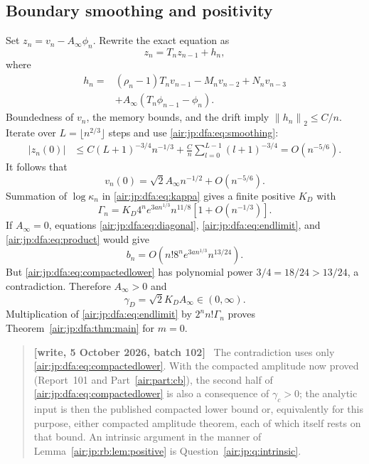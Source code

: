 \documentclass[11pt,letterpaper]{article}
\numberwithin{equation}{section}
\theoremstyle{remark}
\newenvironment{writenotejp}{\par\smallskip\begin{quote}\small\textbf{[write, 5 October 2026, batch 102]}\ }{\end{quote}\smallskip}
\newcommand{\normtwo}[1]{\left\lVert#1\right\rVert_2}
\begin{document}
\subsection{Boundary smoothing and positivity}
Set $z_n=v_n-A_\infty\phi_n$. Rewrite the exact equation as
\[
 z_n=T_nz_{n-1}+h_n,
\]
where
\begin{align*}
 h_n={}&(\rho_n-1)T_nv_{n-1}-M_nv_{n-2}+N_nv_{n-3}\\
 &+A_\infty(T_n\phi_{n-1}-\phi_n).
\end{align*}
Boundedness of $v_n$, the memory bounds, and the drift imply $\normtwo{h_n}\le C/n$. Iterate over $L=\lfloor n^{2/3}\rfloor$ steps and use \eqref{air:jp:dfa:eq:smoothing}:
\begin{align*}
 |z_n(0)|&\le C(L+1)^{-3/4}n^{-1/3}
 +\frac Cn\sum_{l=0}^{L-1}(l+1)^{-3/4}
 =O(n^{-5/6}).
\end{align*}
It follows that
\begin{equation}\label{air:jp:dfa:eq:endlimit}
 v_n(0)=\sqrt2 A_\infty n^{-1/2}+O(n^{-5/6}).
\end{equation}
Summation of $\log\kappa_n$ in \eqref{air:jp:dfa:eq:kappa} gives a finite positive $K_D$ with
\begin{equation}\label{air:jp:dfa:eq:product}
 \Gamma_n=K_D4^ne^{3an^{1/3}}n^{11/8}[1+O(n^{-1/3})].
\end{equation}
If $A_\infty=0$, equations \eqref{air:jp:dfa:eq:diagonal}, \eqref{air:jp:dfa:eq:endlimit}, and \eqref{air:jp:dfa:eq:product} would give
\[
 b_n=O\!\left(n!8^ne^{3an^{1/3}}n^{13/24}\right).
\]
But \eqref{air:jp:dfa:eq:compactedlower} has polynomial power $3/4=18/24>13/24$, a contradiction. Therefore $A_\infty>0$ and
\begin{equation}\label{air:jp:dfa:eq:gamma}
 \gamma_D=\sqrt2 K_DA_\infty\in(0,\infty).
\end{equation}
Multiplication of \eqref{air:jp:dfa:eq:endlimit} by $2^n n!\Gamma_n$ proves Theorem~\ref{air:jp:dfa:thm:main} for $m=0$.
\begin{writenotejp}
The contradiction uses only \eqref{air:jp:dfa:eq:compactedlower}. With the compacted amplitude now proved (Report~101 and Part~\ref{air:part:cb}), the second half of \eqref{air:jp:dfa:eq:compactedlower} is also a consequence of $\gamma_c>0$; the analytic input is then the published compacted lower bound or, equivalently for this purpose, either compacted amplitude theorem, each of which itself rests on that bound. An intrinsic argument in the manner of Lemma~\ref{air:jp:rb:lem:positive} is Question~\ref{air:jp:q:intrinsic}.
\end{writenotejp}
\end{document}
